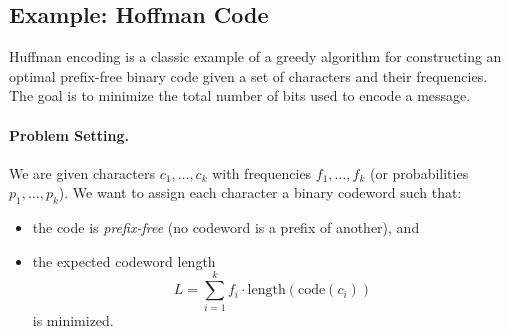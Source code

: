 \documentclass[9pt]{extarticle}
\begin{document}
\subsection{Example: Hoffman Code}

Huffman encoding is a classic example of a greedy algorithm for constructing an
optimal prefix-free binary code given a set of characters and their frequencies.
The goal is to minimize the total number of bits used to encode a message.

\paragraph{Problem Setting.}
We are given characters \(c_1, \dots, c_k\) with frequencies
\(f_1, \dots, f_k\) (or probabilities \(p_1, \dots, p_k\)).
We want to assign each character a binary codeword such that:
\begin{itemize}
    \item the code is \emph{prefix-free} (no codeword is a prefix of another), and
    \item the expected codeword length
    \[
        L = \sum_{i=1}^k f_i \cdot \text{length}(\text{code}(c_i))
    \]
    is minimized.
\end{itemize}
\end{document}
